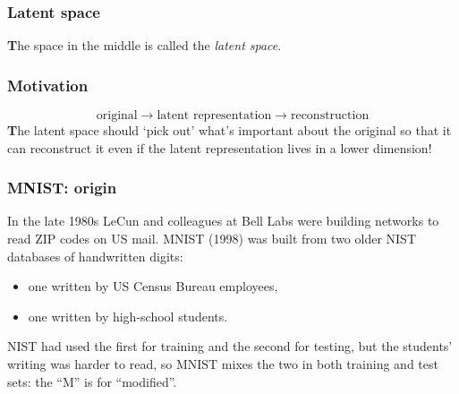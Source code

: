 \documentclass{beamer}
\begin{document}
\begin{frame}
  \frametitle{Latent space}
\vskip 0.25cm
\begin{center}
\end{center}
\vskip 0.2cm
\textbf{T}he space in the middle is called the \textsl{latent space}.
\end{frame}

\begin{frame}
  \frametitle{Motivation}
\vskip 0.25cm
$$\text{original}\rightarrow \text{latent representation} \rightarrow \text{reconstruction}$$
\textbf{T}he latent space should `pick out' what's important about the original so that it can reconstruct it even if the latent representation lives in a lower dimension! 
\end{frame}

\begin{frame}
  \frametitle{MNIST: origin}
\vskip 0.25cm
In the late 1980s LeCun and colleagues at Bell Labs were building networks to read ZIP codes on US mail.
\vskip 0.25cm
MNIST (1998) was built from two older NIST databases of handwritten digits:
\begin{itemize}
\item one written by US Census Bureau employees,
\item one written by high-school students.
\end{itemize}
\vskip 0.25cm
NIST had used the first for training and the second for testing, but the students' writing was harder to read, so MNIST mixes the two in both training and test sets: the ``M'' is for ``modified''.
\end{frame}
\end{document}

